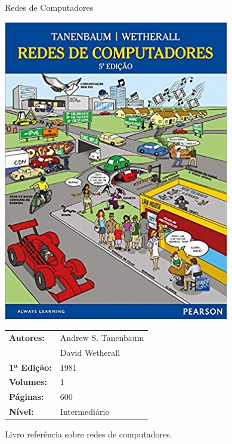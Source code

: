 \begin{frame}[fragile]{Redes de Computadores}

    \begin{minipage}{0.35\textwidth}
        \includegraphics[scale=0.25]{redes.jpg}
    \end{minipage}
    \begin{minipage}{0.55\textwidth}
        \begin{small}
            \begin{tabularx}{0.95\textwidth}{lX}
                \textbf{Autores:} & Andrew S. Tanenbaum \\
                & David Wetherall \\
                \textbf{1ª Edição:} & 1981 \\
                \textbf{Volumes:} & 1 \\
                \textbf{Páginas:} & 600 \\
                \textbf{Nível:} & Intermediário \\
            \end{tabularx}
        \end{small}
    \end{minipage}

    \vspace{0.2in} 

    Livro referência sobre redes de computadores. 

\end{frame}

